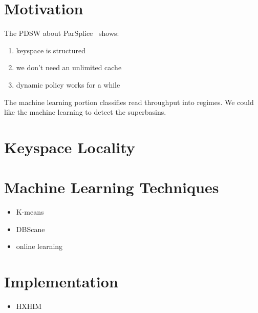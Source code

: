 \section{Motivation}

The PDSW about ParSplice~\cite{perez:jctc20150parsplice} shows:
\begin{enumerate}
  \item keyspace is structured
  \item we don't need an unlimited cache
  \item dynamic policy works for a while
\end{enumerate}

The machine learning portion classifies read throughput into regimes. We could
like the machine learning to detect the superbasins.

\section{Keyspace Locality}


\section{Machine Learning Techniques}
\begin{itemize}
  \item K-means
  \item DBScane
  \item online learning
\end{itemize}

\section{Implementation}
\begin{itemize}
  \item HXHIM
\end{itemize}
